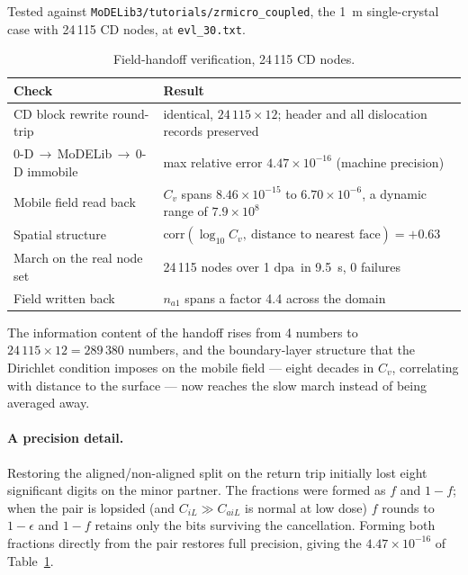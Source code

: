 \documentclass[11pt,a4paper]{article}
\newcommand{\code}[1]{\texttt{\small #1}}
\newcommand{\dpa}{\ensuremath{\mathrm{dpa}}}
\begin{document}
Tested against \code{MoDELib3/tutorials/zrmicro\_coupled}, the 1~\textmu m
single-crystal case with 24\,115 CD nodes, at \code{evl\_30.txt}.

\begin{table}[htb]
\centering
\caption{Field-handoff verification, 24\,115 CD nodes.}
\label{tab:field}
\begin{tabular}{lp{9.3cm}}
\toprule
Check & Result \\
\midrule
CD block rewrite round-trip & identical, $24\,115\times12$; header and all
                              dislocation records preserved \\
0-D\,$\to$\,MoDELib\,$\to$\,0-D immobile & max relative error
                              $4.47\times10^{-16}$ (machine precision) \\
Mobile field read back      & $C_v$ spans $8.46\times10^{-15}$ to
                              $6.70\times10^{-6}$, a dynamic range of
                              $7.9\times10^{8}$ \\
Spatial structure           & $\mathrm{corr}(\log_{10}C_v,\ \text{distance to
                              nearest face}) = +0.63$ \\
March on the real node set  & 24\,115 nodes over 1 \dpa\ in 9.5~s, 0 failures \\
Field written back          & $n_{a1}$ spans a factor 4.4 across the domain \\
\bottomrule
\end{tabular}
\end{table}

The information content of the handoff rises from 4 numbers to
$24\,115\times12=289\,380$ numbers, and the boundary-layer structure that the
Dirichlet condition imposes on the mobile field --- eight decades in $C_v$,
correlating with distance to the surface --- now reaches the slow march instead
of being averaged away.

\paragraph{A precision detail.} Restoring the aligned/non-aligned split on the
return trip initially lost eight significant digits on the minor partner. The
fractions were formed as $f$ and $1-f$; when the pair is lopsided (and
$C_{iL}\gg C_{aiL}$ is normal at low dose) $f$ rounds to $1-\epsilon$ and $1-f$
retains only the bits surviving the cancellation. Forming both fractions
directly from the pair restores full precision, giving the
$4.47\times10^{-16}$ of Table~\ref{tab:field}.
\end{document}
